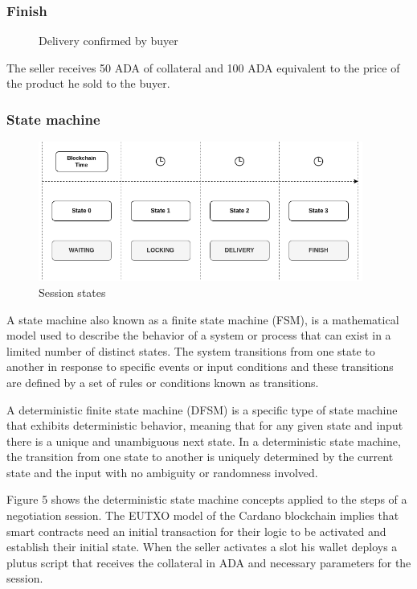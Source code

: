 \documentclass[12pt]{article}
\begin{document}
\subsubsection { Finish }

\begin{figure}[ht]
  \centering
  
  \caption{Delivery confirmed by buyer}
  \label{fig:delivered}
\end{figure}

The seller receives 50 ADA of collateral and 100 ADA equivalent to the price of the product he sold to the buyer.

\subsubsection { State machine }

\begin{figure}[ht]
  \centering
  \includegraphics[width=0.95\textwidth]{machine.png}
  \caption{Session states}
  \label{fig:States}
\end{figure}

A state machine also known as a finite state machine (FSM), is a mathematical model used to describe the behavior of a system or process that can exist in a limited number of distinct states. The system transitions from one state to another in response to specific events or input conditions and these transitions are defined by a set of rules or conditions known as transitions.

A deterministic finite state machine (DFSM) is a specific type of state machine that exhibits deterministic behavior, meaning that for any given state and input there is a unique and unambiguous next state. In a deterministic state machine, the transition from one state to another is uniquely determined by the current state and the input with no ambiguity or randomness involved.

Figure 5 shows the deterministic state machine concepts applied to the steps of a negotiation session. 
The EUTXO model of the Cardano blockchain implies that smart contracts need an initial transaction for their logic to be activated and establish their initial state.
When the seller activates a slot his wallet deploys a plutus script that receives the collateral in ADA and necessary parameters for the session. 
\\
\end{document}
